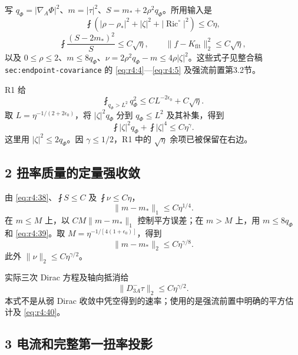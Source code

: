\documentclass[UTF8,11pt,fontset=none]{ctexart}
\begin{document}
写 \(q_\Phi=|\nabla_A\Phi|^2\)、\(m=|\tau|^2\)、\(S=m_*+2\rho^2q_\Phi\)。所用输入是 \[
\fint\left(|\rho-\rho_*|^2+|\zeta|^2+|\operatorname{Ric}^{\circ}|^2\right)\le C\eta,
\] \[
\fint\frac{(S-2m_*)^2}{S}\le C\sqrt\eta,
\qquad
\|f-K_{\mathrm{fit}}\|_2^2\le C\sqrt\eta,
\tag{4.38}\label{eq:r4:38}
\] 以及 \(0\le\rho\le2\)、\(m\le8q_\Phi\)、\(\nu=2\rho^2q_\Phi-m\le4\rho|\zeta|^2\)。这些式子见整合稿 \texttt{sec:endpoint-covariance} 的 \eqref{eq:r4:4}---\eqref{eq:r4:5} 及强流前置第3.2节。

R1 给 \[
\fint_{q_\Phi>L^2}q_\Phi^2
\le C L^{-2\epsilon_0}+C\sqrt\eta.
\tag{4.39}\label{eq:r4:39}
\] 取 \(L=\eta^{-1/(2+2\epsilon_0)}\)，将 \(|\zeta|^2q_\Phi\) 分到 \(q_\Phi\le L^2\) 及其补集，得到 \[
\fint|\zeta|^2q_\Phi+\fint|\zeta|^4\le C\eta^\gamma.
\tag{4.40}\label{eq:r4:40}
\] 这里用 \(|\zeta|^2\le2q_\Phi\)。因 \(\gamma\le1/2\)，R1 中的 \(\sqrt\eta\) 余项已被保留在右边。

\subsection{2 扭率质量的定量强收敛}\label{ch4:ux626dux7387ux8d28ux91cfux7684ux5b9aux91cfux5f3aux6536ux655b}

由 \eqref{eq:r4:38}、\(\fint S\le C\) 及 \(\fint\nu\le C\eta\)， \[
\|m-m_*\|_1\le C\eta^{1/4}.
\] 在 \(m\le M\) 上，以 \(CM\|m-m_*\|_1\) 控制平方误差；在 \(m>M\) 上，用 \(m\le8q_\Phi\) 和 \eqref{eq:r4:39}。取 \(M=\eta^{-1/[4(1+\epsilon_0)]}\)，得到 \[
\boxed{\|m-m_*\|_2\le C\eta^{\gamma/8}.}
\tag{4.41}\label{eq:r4:41}
\] 此外 \(\|\nu\|_2\le C\eta^{\gamma/2}\)。

实际三次 Dirac 方程及轴向抵消给 \[
\|D^-_{3A}\tau\|_2\le C\eta^{\gamma/2}.
\tag{4.42}\label{eq:r4:42}
\] 本式不是从弱 Dirac 收敛中凭空得到的速率；使用的是强流前置中明确的平方估计及 \eqref{eq:r4:40}。

\subsection{3 电流和完整第一扭率投影}\label{ch4:ux7535ux6d41ux548cux5b8cux6574ux7b2cux4e00ux626dux7387ux6295ux5f71}
\end{document}
